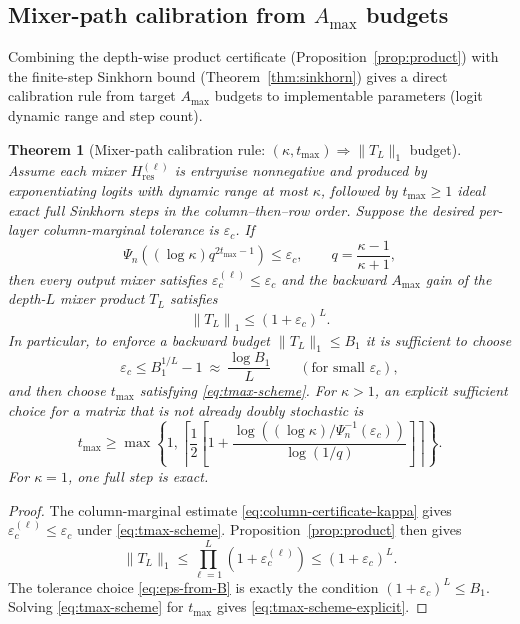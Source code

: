 \documentclass[10pt]{article}
\numberwithin{equation}{section}
\theoremstyle{plain}
\newtheorem{theorem}{Theorem}[section]
\theoremstyle{definition}
\theoremstyle{remark}
\newcommand{\norm}[1]{\left\lVert #1 \right\rVert}
\newcommand{\Hres}{H_{\mathrm{res}}}
\newcommand{\Amax}{\texorpdfstring{\ensuremath{A_{\max}}}{Amax}\xspace}
\begin{document}
\subsection{Mixer-path calibration from \Amax budgets}\label{subsec:scheme}
Combining the depth-wise product certificate (Proposition~\ref{prop:product}) with the finite-step Sinkhorn bound (Theorem~\ref{thm:sinkhorn}) gives a direct calibration rule from target \Amax budgets to implementable parameters (logit dynamic range and step count).

\begin{theorem}[Mixer-path calibration rule: $(\kappa,t_{\max}) \Rightarrow \|T_L\|_1$ budget]\label{thm:calibration}
Assume each mixer $\Hres^{(\ell)}$ is entrywise nonnegative and produced by exponentiating logits with dynamic range at most $\kappa$, followed by $t_{\max}\ge1$ ideal exact full Sinkhorn steps in the column--then--row order. Suppose the desired per-layer column-marginal tolerance is $\varepsilon_c$. If
\begin{equation}\label{eq:tmax-scheme}
\Psi_n\!\left((\log\kappa)q^{2t_{\max}-1}\right)
\le
\varepsilon_c,
\qquad
q=\frac{\kappa-1}{\kappa+1},
\end{equation}
then every output mixer satisfies $\varepsilon_c^{(\ell)}\le\varepsilon_c$ and the backward \Amax gain of the depth-$L$ mixer product $T_L$ satisfies
\begin{equation}
\norm{T_L}_1 \le (1+\varepsilon_c)^L.
\end{equation}
In particular, to enforce a backward budget $\|T_L\|_1\le B_1$ it is sufficient to choose
\begin{equation}\label{eq:eps-from-B}
\varepsilon_c \le B_1^{1/L}-1 \ \approx\ \frac{\log B_1}{L}
\qquad (\text{for small }\varepsilon_c),
\end{equation}
and then choose $t_{\max}$ satisfying \eqref{eq:tmax-scheme}. For $\kappa>1$, an explicit sufficient choice for a matrix that is not already
doubly stochastic is
\begin{equation}\label{eq:tmax-scheme-explicit}
t_{\max}
\ge
\max\left\{
1,
\left\lceil
\frac12
\left[
1+
\frac{\log\!\left((\log\kappa)/\Psi_n^{-1}(\varepsilon_c)\right)}
{\log(1/q)}
\right]
\right\rceil
\right\}.
\end{equation}
For $\kappa=1$, one full step is exact.
\end{theorem}

\begin{proof}
The column-marginal estimate \eqref{eq:column-certificate-kappa} gives
\(\varepsilon_c^{(\ell)}\le\varepsilon_c\) under \eqref{eq:tmax-scheme}.
Proposition~\ref{prop:product} then gives
\[
\|T_L\|_1
\le
\prod_{\ell=1}^L(1+\varepsilon_c^{(\ell)})
\le
(1+\varepsilon_c)^L.
\]
The tolerance choice \eqref{eq:eps-from-B} is exactly the condition $(1+\varepsilon_c)^L\le B_1$. Solving \eqref{eq:tmax-scheme} for $t_{\max}$ gives \eqref{eq:tmax-scheme-explicit}.
\end{proof}
\end{document}
